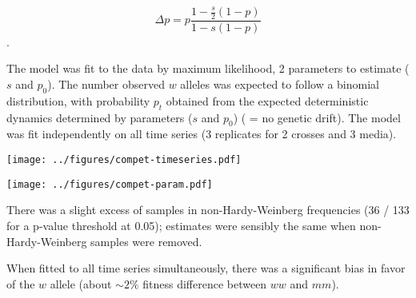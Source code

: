 \documentclass[10pt]{article}
\begin{document}
$$\Delta p = p \frac{1-\frac{s}{2}(1-p)}{1-s(1-p)}$$. 

The model was fit to the data by maximum likelihood, 2 parameters to estimate ($s$ and $p_0$). The number observed $w$ alleles was expected to follow a binomial distribution, with probability $p_t$ obtained from the expected deterministic dynamics determined by parameters ($s$ and $p_0$) ( = no genetic drift). The model was fit independently on all time series (3 replicates for 2 crosses and 3 media). 

\begin{center}
    \texttt{[image: ../figures/compet-timeseries.pdf]}
\end{center}

\begin{center}
    \texttt{[image: ../figures/compet-param.pdf]}
\end{center}

There was a slight excess of samples in non-Hardy-Weinberg frequencies (36 / 133 for a p-value threshold at 0.05); estimates were sensibly the same when non-Hardy-Weinberg samples were removed.

\begin{minipage}{\linewidth}\end{minipage}

\vspace{0.5cm}

When fitted to all time series simultaneously, there was a significant bias in favor of the $w$ allele (about $\sim 2\%$ fitness difference between $ww$ and $mm$). 
\end{document}
